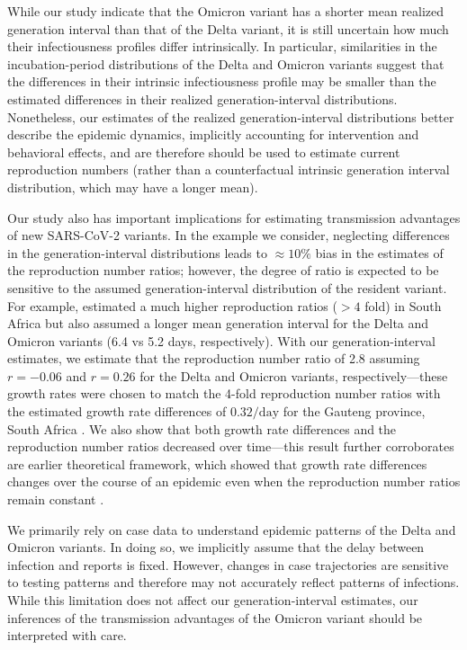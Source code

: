 \documentclass[12pt]{article}
\begin{document}
While our study indicate that the Omicron variant has a shorter mean realized generation interval than that of the Delta variant, it is still uncertain how much their infectiousness profiles differ intrinsically.
In particular, similarities in the incubation-period distributions of the Delta and Omicron variants suggest that the differences in their intrinsic infectiousness profile may be smaller than the estimated differences in their realized generation-interval distributions.
Nonetheless, our estimates of the realized generation-interval distributions better describe the epidemic dynamics, implicitly accounting for intervention and behavioral effects, and are therefore should be used to estimate current reproduction numbers (rather than a counterfactual intrinsic generation interval distribution, which may have a longer mean).

Our study also has important implications for estimating transmission advantages of new SARS-CoV-2 variants.
In the example we consider, neglecting differences in the generation-interval distributions leads to $\approx 10\%$ bias in the estimates of the reproduction number ratios; however, the degree of ratio is expected to be sensitive to the assumed generation-interval distribution of the resident variant.
For example, \cite{pearson2021bounding} estimated a much higher reproduction ratios ($> 4$ fold) in South Africa but also assumed a longer mean generation interval for the Delta and Omicron variants (6.4 vs 5.2 days, respectively).
With our generation-interval estimates, we estimate that the reproduction number ratio of 2.8 assuming $r=-0.06$ and $r=0.26$ for the Delta and Omicron variants, respectively---these growth rates were chosen to match the 4-fold reproduction number ratios with the estimated growth rate differences of $0.32/\mathrm{day}$ for the Gauteng province, South Africa \cite{pearson2021bounding}.
We also show that both growth rate differences and the reproduction number ratios decreased over time---this result further corroborates are earlier theoretical framework, which showed that growth rate differences changes over the course of an epidemic even when the reproduction number ratios remain constant \citep{park2021roles}.

We primarily rely on case data to understand epidemic patterns of the Delta and Omicron variants.
In doing so, we implicitly assume that the delay between infection and reports is fixed.
However, changes in case trajectories are sensitive to testing patterns and therefore may not accurately reflect patterns of infections.
While this limitation does not affect our generation-interval estimates, our inferences of the transmission advantages of the Omicron variant should be interpreted with care.
\end{document}
